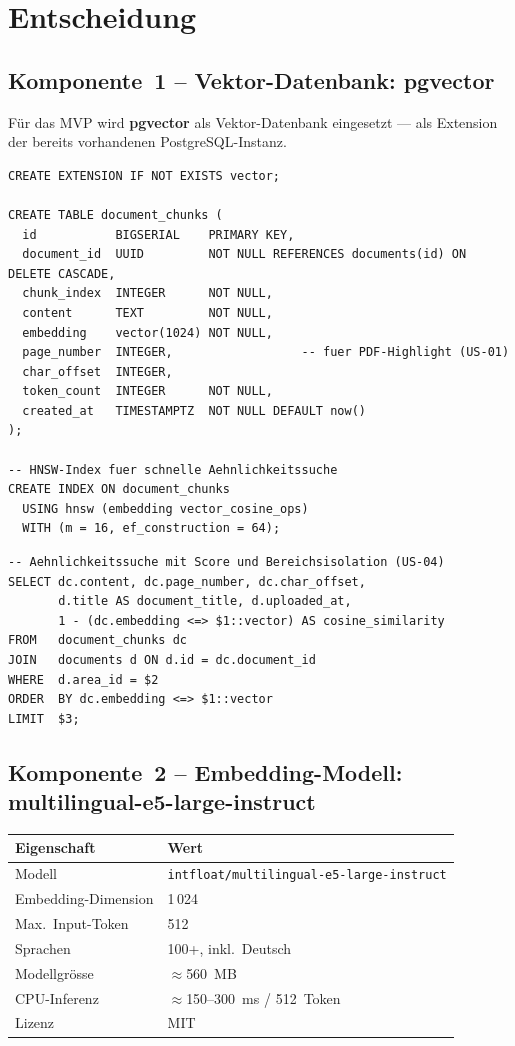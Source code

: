\documentclass[a4paper, 11pt, oneside]{report}
\newcommand{\code}[1]{\texttt{\small #1}}
\begin{document}
\section{Entscheidung}

\subsection{Komponente~1 -- Vektor-Datenbank: pgvector}

Für das MVP wird \textbf{pgvector} als Vektor-Datenbank eingesetzt ---
als Extension der bereits vorhandenen PostgreSQL-Instanz.

\begin{lstlisting}[language=LearnSQL]
CREATE EXTENSION IF NOT EXISTS vector;

CREATE TABLE document_chunks (
  id           BIGSERIAL    PRIMARY KEY,
  document_id  UUID         NOT NULL REFERENCES documents(id) ON DELETE CASCADE,
  chunk_index  INTEGER      NOT NULL,
  content      TEXT         NOT NULL,
  embedding    vector(1024) NOT NULL,
  page_number  INTEGER,                  -- fuer PDF-Highlight (US-01)
  char_offset  INTEGER,
  token_count  INTEGER      NOT NULL,
  created_at   TIMESTAMPTZ  NOT NULL DEFAULT now()
);

-- HNSW-Index fuer schnelle Aehnlichkeitssuche
CREATE INDEX ON document_chunks
  USING hnsw (embedding vector_cosine_ops)
  WITH (m = 16, ef_construction = 64);
\end{lstlisting}

\begin{lstlisting}[language=LearnSQL]
-- Aehnlichkeitssuche mit Score und Bereichsisolation (US-04)
SELECT dc.content, dc.page_number, dc.char_offset,
       d.title AS document_title, d.uploaded_at,
       1 - (dc.embedding <=> $1::vector) AS cosine_similarity
FROM   document_chunks dc
JOIN   documents d ON d.id = dc.document_id
WHERE  d.area_id = $2
ORDER  BY dc.embedding <=> $1::vector
LIMIT  $3;
\end{lstlisting}

\subsection{Komponente~2 -- Embedding-Modell: multilingual-e5-large-instruct}

\begin{table}[htb]
\small\centering
\begin{tabular}{@{}ll@{}}
\toprule
\rowcolor{tabhead}
\textbf{Eigenschaft} & \textbf{Wert} \\
\midrule
Modell              & \code{intfloat/multilingual-e5-large-instruct} \\
Embedding-Dimension & 1\,024 \\
Max.\ Input-Token   & 512 \\
Sprachen            & 100+, inkl.\ Deutsch \\
Modellgrösse        & $\approx$560~MB \\
CPU-Inferenz        & $\approx$150--300~ms / 512~Token \\
Lizenz              & MIT \\
\bottomrule
\end{tabular}
\end{table}
\end{document}
